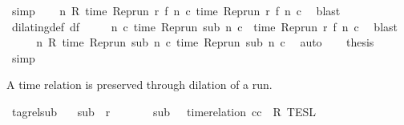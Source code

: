 \begin{isabellebody}
\ simp\isanewline
\ \ \isamarkupfalse%
\ {\isacartoucheopen}{\isasymforall}n\ R\ {\isacharparenleft}time\ {\isacharparenleft}{\isacharparenleft}Rep{\isacharunderscore}run\ r{\isacharparenright}\ {\isacharparenleft}f\ n\ c\ time\ {\isacharparenleft}{\isacharparenleft}Rep{\isacharunderscore}run\ r{\isacharparenright}\ {\isacharparenleft}f\ n\ c\ \isamarkupfalse%
\ blast\isanewline
\ \ \isamarkupfalse%
\ \isamarkupfalse%
\ dilating{\isacharunderscore}def\ df\ \isamarkupfalse%
\isanewline
\ \ \ \ {\isacartoucheopen}{\isasymforall}n\ c{\isachardot}\ time\ {\isacharparenleft}{\isacharparenleft}Rep{\isacharunderscore}run\ sub{\isacharparenright}\ n\ c{\isacharparenright}\ {\isacharequal}\ time\ {\isacharparenleft}{\isacharparenleft}Rep{\isacharunderscore}run\ r{\isacharparenright}\ {\isacharparenleft}f\ n{\isacharparenright}\ c{\isacharparenright}{\isacartoucheclose}\ \isamarkupfalse%
\ blast\isanewline
\ \ \isamarkupfalse%
\ \isamarkupfalse%
\ {\isacartoucheopen}{\isasymforall}n\ R\ {\isacharparenleft}time\ {\isacharparenleft}{\isacharparenleft}Rep{\isacharunderscore}run\ sub{\isacharparenright}\ n\ c\ time\ {\isacharparenleft}{\isacharparenleft}Rep{\isacharunderscore}run\ sub{\isacharparenright}\ n\ c\ \isamarkupfalse%
\ auto\isanewline
\ \ \isamarkupfalse%
\ {\isacharquery}thesis\ \isamarkupfalse%
\ simp\isanewline
{}\isamarkupfalse%
%
\endisatagproof
{\isafoldproof}%
%
\isadelimproof
%
\endisadelimproof
%
\begin{isamarkuptext}%
A time relation is preserved through dilation of a run.%
\end{isamarkuptext}\isamarkuptrue%
\isamarkupfalse%
\ tagrel{\isacharunderscore}sub{\isacharprime}{\isacharcolon}\isanewline
\ \ \ {\isacartoucheopen}sub\ {\isasymlless}\ r{\isacartoucheclose}\isanewline
\ \ \ \ \ \ \ {\isacartoucheopen}sub\ {\isasymin}\ {\isasymlbrakk}\ time{\isacharminus}relation\ {\isasymlfloor}cc\ {\isasymin}\ R\ {\isasymrbrakk}\isactrlsub T\isactrlsub E\isactrlsub S\isactrlsub L{\isacartoucheclose}\isanewline

\end{isabellebody}

